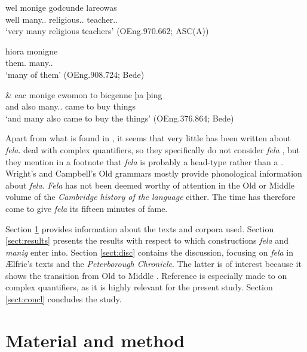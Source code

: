 \documentclass[output=paper,colorlinks,citecolor=brown]{langscibook}
\begin{document}
\ea\label{manigdep}
\gll wel monige godcunde lareowas\\
	well many.\ACC.\PL{} religious.\ACC.\PL{} teacher.\ACC.\PL{}\\
\glt ‘very many religious teachers’ (OEng.970.662; ASC(A))
\z

\ea\label{manigindep}
\gll hiora monigne\\
	them.\GEN{} many.\ACC.\SG{}\\ 
\glt ‘many of them’ (OEng.908.724; Bede)
\z

\ea\label{manigalone}
\gll \& eac monige cwomon to bicgenne þa þing\\
	 and also many.\NOM.\PL{} came to buy \DEF{} things\\
\glt ‘and many also came to buy the things’	(OEng.376.864; Bede)
\z

Apart from what is found in \citet{Mitchell85}, it seems that very little has been written about \textit{fela}. 
 \citet{RoehrsSapp18} deal with complex quantifiers, so they specifically do not consider \textit{fela} \citeyearpar[389]{RoehrsSapp18}, but they mention in a footnote that \textit{fela} is probably a head-type rather than a  \citeyearpar[389, fn. 6]{RoehrsSapp18}. Wright’s \citeyearpar{WrightWright25} and Campbell’s \citeyearpar{Campbell62} Old  grammars mostly provide phonological information about \textit{fela}. \textit{Fela} has not been deemed worthy of attention in the Old  \citep{Hogg92} or Middle  \citep{Blake92} volume of the \textit{Cambridge history of the  language} either. The time has therefore come to give \textit{fela} its fifteen minutes of fame.  

Section \ref{sect:matmeth} provides information about the texts and corpora used. Section \ref{sect:results} presents the results with respect to which constructions \textit{fela} and \textit{manig} enter into. Section \ref{sect:disc} contains the discussion, focusing on \textit{fela} in Ælfric's texts and the \textit{Peterborough Chronicle}. The latter is of interest because it shows the transition from Old to Middle . Reference is especially made to \citet{RoehrsSapp18} on complex quantifiers, as it is highly relevant for the present study. Section \ref{sect:concl} concludes the study.

\section{Material and method}\label{sect:matmeth}
\end{document}
